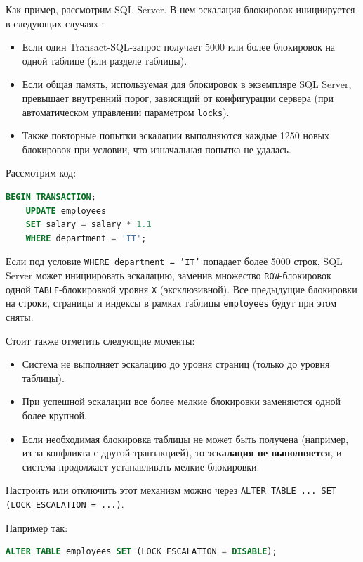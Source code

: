 Как пример, рассмотрим SQL Server. В нем эскалация блокировок инициируется в следующих случаях \autocite{MicrosoftLearnSQLserverTransLock}:
\begin{itemize}
    \item Если один Transact-SQL-запрос получает 5000 или более блокировок на одной таблице (или разделе таблицы).
    \item Если общая память, используемая для блокировок в экземпляре SQL Server, превышает внутренний порог, зависящий от конфигурации сервера (при автоматическом управлении параметром \texttt{locks}).
    \item Также повторные попытки эскалации выполняются каждые 1250 новых блокировок при условии, что изначальная попытка не удалась.
\end{itemize}

Рассмотрим код:
\begin{lstlisting}[language=SQL]
    BEGIN TRANSACTION;
    UPDATE employees
    SET salary = salary * 1.1
    WHERE department = 'IT';
\end{lstlisting}

Если под условие \texttt{WHERE department = 'IT'} попадает более 5000 строк, SQL Server может инициировать эскалацию, заменив множество \texttt{ROW}-блокировок одной \texttt{TABLE}-блокировкой уровня \texttt{X} (эксклюзивной). Все предыдущие блокировки на строки, страницы и индексы в рамках таблицы \texttt{employees} будут при этом сняты.

Стоит также отметить следующие моменты:
\begin{itemize}
    \item Система не выполняет эскалацию до уровня страниц (только до уровня таблицы).
    \item При успешной эскалации все более мелкие блокировки заменяются одной более крупной.
    \item Если необходимая блокировка таблицы не может быть получена (например, из-за конфликта с другой транзакцией), то \textbf{эскалация не выполняется}, и система продолжает устанавливать мелкие блокировки.
\end{itemize}

Настроить или отключить этот механизм можно через \texttt{ALTER TABLE ... SET (LOCK ESCALATION = ...)}.

Например так:
\begin{lstlisting}[language=SQL]
    ALTER TABLE employees SET (LOCK_ESCALATION = DISABLE);
\end{lstlisting}

